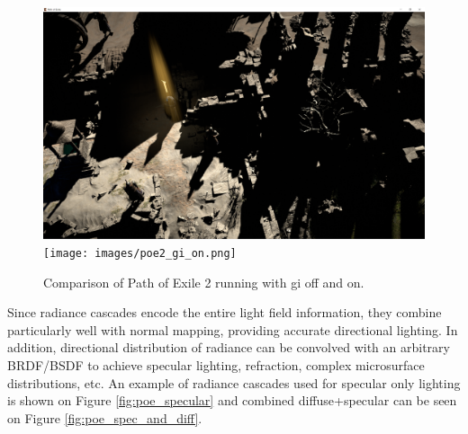 \documentclass{jcgt}
\begin{document}
\begin{figure}[htb]
  \centering
  \includegraphics[width=\columnwidth]{images/poe2_gi_off.png}
  \texttt{[image: images/poe2\_gi\_on.png]}
  \caption{\label{fig:poe_gi_onoff}
     Comparison of Path of Exile 2 running with gi off and on.}
\end{figure}


Since radiance cascades encode the entire light field information, they combine particularly well with normal mapping, providing accurate directional lighting. In addition, directional distribution of radiance can be convolved with an arbitrary BRDF/BSDF to achieve specular lighting, refraction, complex microsurface distributions, etc. An example of radiance cascades used for specular only lighting is shown on Figure \ref{fig:poe_specular} and combined diffuse+specular can be seen on Figure \ref{fig:poe_spec_and_diff}.
\end{document}
